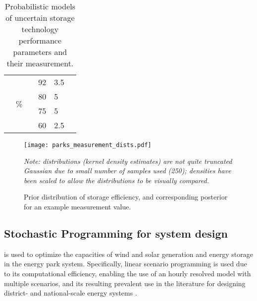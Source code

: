 \begin{table}[h]
\begin{tabularx}{\linewidth}{YYYYYY}
        \midrule
         &  &  & 92 & 3.5 &  \\
        & &  & 80 & 5 & \\
        & &  & 75 & 5 & \\
        & &  & 60 & 2.5 & \\
        \bottomrule \bottomrule
    \end{tabularx}
    \smallskip
    \caption{Probabilistic models of uncertain storage technology performance parameters and their measurement.} \label{tab:parks-tech-prob-models}
\end{table}

\begin{figure}[h]
    \centering
    \texttt{[image: parks\_measurement\_dists.pdf]}
    \caption{Prior distribution of storage efficiency, and corresponding posterior for an example measurement value.}
    \label{fig:parks-msr-dists}
    \vspace{0.1cm}
    \footnotesize{\textit{Note: distributions (kernel density estimates) are not quite truncated Gaussian due to small number of samples used (250); densities have been scaled to allow the distributions to be visually compared.}}
\end{figure}


\clearpage
\subsection{Stochastic Programming for system design} \label{sec:parks-SP}


 is used to optimize the capacities of wind and solar generation and energy storage in the energy park system. Specifically, linear scenario programming is used due to its computational efficiency, enabling the use of an hourly resolved model with multiple scenarios, and its resulting prevalent use in the literature for designing district- and national-scale energy systems \citep{decarolis2017FormalizingBestPractice,pickering2019DistrictEnergySystem,yue2018ReviewApproachesUncertainty}.

